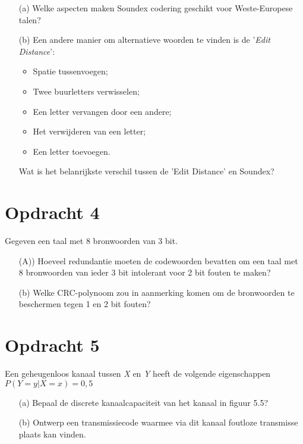 \begin{itemize}
  \item[(a)] Welke aspecten maken Soundex codering geschikt voor Weste-Europese talen?
  \item[(b)] Een andere manier om alternatieve woorden te vinden is de '\emph{Edit Distance}':
    \begin{itemize}
      \item Spatie tussenvoegen;
      \item Twee buurletters verwisselen;
      \item Een letter vervangen door een andere;
      \item Het verwijderen van een letter;
      \item Een letter toevoegen.
    \end{itemize}
    Wat is het belanrijkste verschil tussen de 'Edit Distance' en Soundex?
\end{itemize}

\section{Opdracht 4}
Gegeven een taal met 8 bronwoorden van 3 bit.
\begin{itemize}
  \item[(A))] Hoeveel redundantie moeten de codewoorden bevatten om een taal met 8 bronwoorden van ieder 3 bit intolerant voor 2 bit fouten te maken?
\item[(b)] Welke CRC-polynoom zou in aanmerking komen om de bronwoorden te beschermen tegen 1 en 2 bit fouten?
\end{itemize}

\section{Opdracht 5}
Een geheugenloos kanaal tussen \emph{X} en \emph{Y} heeft de volgende eigenschappen $P(Y=y|X=x)=0,5$
\begin{itemize}
  \item[(a)] Bepaal de discrete kanaalcapaciteit van het kanaal in figuur 5.5?
  \item[(b)] Ontwerp een transmissiecode waarmee via dit kanaal foutloze transmisse plaats kan vinden.
\end{itemize}
